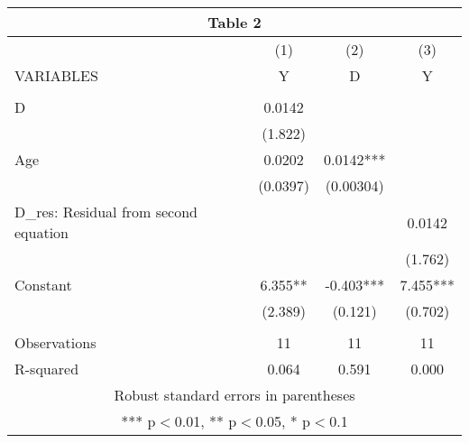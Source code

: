 \documentclass[]{article}
\begin{document}
\begin{tabular}{lccc}
\multicolumn{4}{c}{Table 2} \\ \hline
 & (1) & (2) & (3) \\
VARIABLES & Y & D & Y \\ \hline
 &  &  &  \\
D & 0.0142 &  &  \\
 & (1.822) &  &  \\
Age & 0.0202 & 0.0142*** &  \\
 & (0.0397) & (0.00304) &  \\
D\_res: Residual from second equation &  &  & 0.0142 \\
 &  &  & (1.762) \\
Constant & 6.355** & -0.403*** & 7.455*** \\
 & (2.389) & (0.121) & (0.702) \\
 &  &  &  \\
Observations & 11 & 11 & 11 \\
 R-squared & 0.064 & 0.591 & 0.000 \\ \hline
\multicolumn{4}{c}{ Robust standard errors in parentheses} \\
\multicolumn{4}{c}{ *** p$<$0.01, ** p$<$0.05, * p$<$0.1} \\
\end{tabular}
\end{document}
